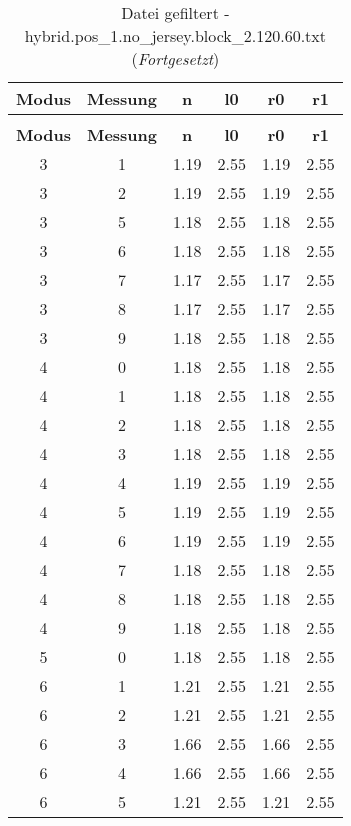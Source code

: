 \begin{longtable}{|c|c||c||c||c|c|}
	\caption{Datei gefiltert - hybrid.pos\_1.no\_jersey.block\_2.120.60.txt} \label{tab:hybrid.pos-1.no-jersey.block-2.120.60.txt} \\ \hline
	\textbf{Modus} & \textbf{Messung} & \textbf{n} & \textbf{l0} & \textbf{r0} & \textbf{r1}\\ \hline
	\endfirsthead
	\caption[]{Datei gefiltert - hybrid.pos\_1.no\_jersey.block\_2.120.60.txt (\emph{Fortgesetzt})} \\ \hline
	\textbf{Modus} & \textbf{Messung} & \textbf{n} & \textbf{l0} & \textbf{r0} & \textbf{r1}\\ \hline
	\endhead
	3 & 1 & 1.19 & 2.55 & 1.19 & 2.55 \\ \hline
	3 & 2 & 1.19 & 2.55 & 1.19 & 2.55 \\ \hline
	3 & 5 & 1.18 & 2.55 & 1.18 & 2.55 \\ \hline
	3 & 6 & 1.18 & 2.55 & 1.18 & 2.55 \\ \hline
	3 & 7 & 1.17 & 2.55 & 1.17 & 2.55 \\ \hline
	3 & 8 & 1.17 & 2.55 & 1.17 & 2.55 \\ \hline
	3 & 9 & 1.18 & 2.55 & 1.18 & 2.55 \\ \hline
	4 & 0 & 1.18 & 2.55 & 1.18 & 2.55 \\ \hline
	4 & 1 & 1.18 & 2.55 & 1.18 & 2.55 \\ \hline
	4 & 2 & 1.18 & 2.55 & 1.18 & 2.55 \\ \hline
	4 & 3 & 1.18 & 2.55 & 1.18 & 2.55 \\ \hline
	4 & 4 & 1.19 & 2.55 & 1.19 & 2.55 \\ \hline
	4 & 5 & 1.19 & 2.55 & 1.19 & 2.55 \\ \hline
	4 & 6 & 1.19 & 2.55 & 1.19 & 2.55 \\ \hline
	4 & 7 & 1.18 & 2.55 & 1.18 & 2.55 \\ \hline
	4 & 8 & 1.18 & 2.55 & 1.18 & 2.55 \\ \hline
	4 & 9 & 1.18 & 2.55 & 1.18 & 2.55 \\ \hline
	5 & 0 & 1.18 & 2.55 & 1.18 & 2.55 \\ \hline
	6 & 1 & 1.21 & 2.55 & 1.21 & 2.55 \\ \hline
	6 & 2 & 1.21 & 2.55 & 1.21 & 2.55 \\ \hline
	6 & 3 & 1.66 & 2.55 & 1.66 & 2.55 \\ \hline
	6 & 4 & 1.66 & 2.55 & 1.66 & 2.55 \\ \hline
	6 & 5 & 1.21 & 2.55 & 1.21 & 2.55 \\ \hline

\end{longtable}
